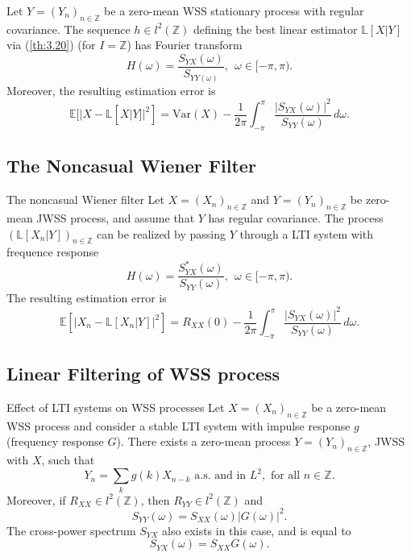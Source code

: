 \documentclass{article}
\begin{document}
\begin{cor}{}{}
Let \( Y = (Y_{n} )_{n \in \mathbb{Z} } \) be a zero-mean WSS stationary process with regular covariance. The sequence \( h \in l^2(\mathbb{Z} ) \) defining the best linear estimator \( \mathbb{L} [X|Y] \) via (\ref{th:3.20}) (for \( I = \mathbb{Z}  \)) has Fourier transform
\[
    H(\omega ) = \frac{S_{YX}(\omega ) }{S_{YY(\omega )}}, \ \ \omega \in [- \pi ,\pi ). 
\]
Moreover, the resulting estimation error is 
\[
    \mathbb{E} [|X - \mathbb{L} [X|Y]|^{2} ] = \mathrm{Var} (X) - \frac{1}{2\pi }\int_{- \pi}^{\pi} \frac{\left\lvert S_{YX}(\omega )  \right\rvert^{2}  }{S_{Y Y }(\omega )}  \,d \omega .  
\]

\end{cor}

\subsection{The Noncasual Wiener Filter}

\begin{thrm}{The noncasual Wiener filter}{}
Let \( X = (X_{n} )_{n \in \mathbb{Z} } \) and \( Y = ( Y_{n} )_{n \in \mathbb{Z} } \) be zero-mean JWSS process, and assume that \( Y \) has regular covariance. The process \( (\mathbb{L} [X_{n} |Y])_{n \in \mathbb{Z} } \) can be realized by passing \( Y \) through a LTI system with frequence response 
\[
    H(\omega ) = \frac{S^{\ast} _{YX}(\omega )}{S_{Y Y}(\omega )} , \ \ \omega \in [- \pi ,\pi ).
\]
The resulting estimation error is
\[
    \mathbb{E} [\left\lvert X_{n} - \mathbb{L} [X_{n} |Y] \right\rvert^{2}  ] = R_{XX}(0) - \frac{1}{2\pi }\int_{- \pi}^{\pi} \frac{\left\lvert S_{YX}(\omega )  \right\rvert^{2}  }{S_{YY}(\omega ) }  \,d \omega . 
\]
\end{thrm}
\subsection{Linear Filtering of WSS process}

\begin{thrm}{Effect of LTI systems on WSS processes}{}
Let \( X = (X_{n} )_{n \in \mathbb{Z} } \) be a zero-mean WSS process and consider a stable LTI system with impulse response \( g \) (frequency response \( G \)). There exists a zero-mean process \( Y = (Y_{n} )_{n \in \mathbb{Z} } \), JWSS with \( X \), such that
\[
    Y_{n} = \sum_{k} g(k)X_{n - k} \text{ a.s. and in } L^2, \text{ for all } n \in \mathbb{Z} . 
\]
Moreover, if \( R_{X X} \in l^2(\mathbb{Z} )\), then \( R_{Y Y}\in l^{2 } (\mathbb{Z} )  \) and 
\[
    S_{YY}(\omega ) = S_{X X}(\omega )|G(\omega )|^{2} .
\]
The cross-power spectrum \( S_{YX}   \) also exists in this case, and is equal to
\[
    S_{YX} (\omega )= S_{XX}G(\omega ).  
\]
\end{thrm}
\end{document}
